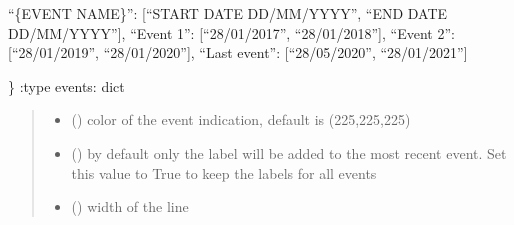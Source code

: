 \documentclass[letterpaper,10pt,english]{sphinxmanual}
\begin{document}
\begin{fulllineitems}
\begin{quote}
\begin{description}
\end{description}\end{quote}
\begin{description}
\sphinxAtStartPar
“\{EVENT NAME\}”: {[}“START DATE DD/MM/YYYY”, “END DATE DD/MM/YYYY”{]},
“Event 1”: {[}“28/01/2017”, “28/01/2018”{]},
“Event 2”: {[}“28/01/2019”, “28/01/2020”{]},
“Last event”: {[}“28/05/2020”, “28/01/2021”{]}

\end{description}

\sphinxAtStartPar
\}
:type events: dict
\begin{quote}\begin{description}
\begin{itemize}
\item {} 
\sphinxAtStartPar
{} () \textendash{} color of the event indication, default is (225,225,225)

\item {} 
\sphinxAtStartPar
{} () \textendash{} by default only the label will be added to the most recent event. Set this value to True to keep the labels for all events

\item {} 
\sphinxAtStartPar
{} () \textendash{} width of the line

\end{itemize}

\end{description}\end{quote}

\begin{fulllineitems}
\label{\detokenize{index:sjvisualizer.LineChart.line_chart.draw}}
\pysigstartsignatures
{}
\pysigstopsignatures
\end{fulllineitems}


\begin{fulllineitems}
\label{\detokenize{index:sjvisualizer.LineChart.line_chart.update}}
\pysigstartsignatures
{}
\pysigstopsignatures
\end{fulllineitems}


\end{fulllineitems}
\end{document}
